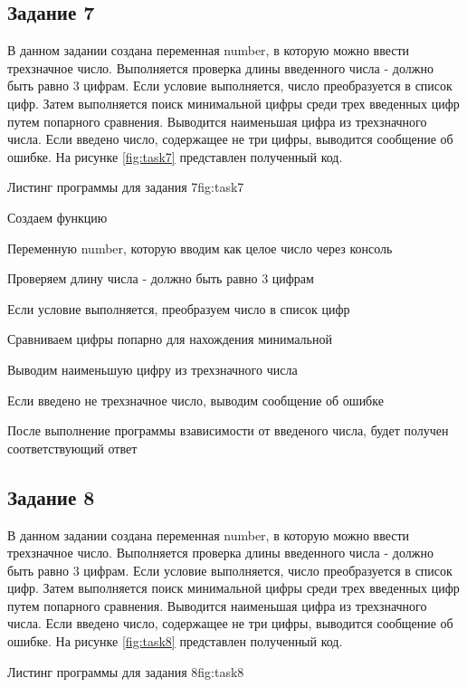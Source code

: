 \documentclass{vvsu}
\begin{document}
\subsection{Задание 7}
В данном задании создана переменная number, в которую можно ввести трехзначное число. Выполняется проверка длины введенного числа - должно быть равно 3 цифрам. Если условие выполняется, число преобразуется в список цифр. Затем выполняется поиск минимальной цифры среди трех введенных цифр путем попарного сравнения. Выводится наименьшая цифра из трехзначного числа. Если введено число, содержащее не три цифры, выводится сообщение об ошибке. На рисунке \ref{fig:task7} представлен полученный код.
\begin{vvsu_figure}{Листинг программы для задания 7}{fig:task7}
    \begin{minipage}{.75\textwidth}
        
    \end{minipage}
\end{vvsu_figure}

\begin{vvsu_list}
\item Создаем функцию
\item Переменную number, которую вводим как целое число через консоль
\item Проверяем длину числа - должно быть равно 3 цифрам
\item Если условие выполняется, преобразуем число в список цифр
\item Сравниваем цифры попарно для нахождения минимальной
\item Выводим наименьшую цифру из трехзначного числа
\item Если введено не трехзначное число, выводим сообщение об ошибке
\end{vvsu_list}


После выполнение программы взависимости от введеного числа, будет получен соответствующий ответ

\subsection{Задание 8}
В данном задании создана переменная number, в которую можно ввести трехзначное число. Выполняется проверка длины введенного числа - должно быть равно 3 цифрам. Если условие выполняется, число преобразуется в список цифр. Затем выполняется поиск минимальной цифры среди трех введенных цифр путем попарного сравнения. Выводится наименьшая цифра из трехзначного числа. Если введено число, содержащее не три цифры, выводится сообщение об ошибке. На рисунке \ref{fig:task8} представлен полученный код.
\begin{vvsu_figure}{Листинг программы для задания 8}{fig:task8}
    \begin{minipage}{.75\textwidth}
        
    \end{minipage}
\end{vvsu_figure}
\end{document}

